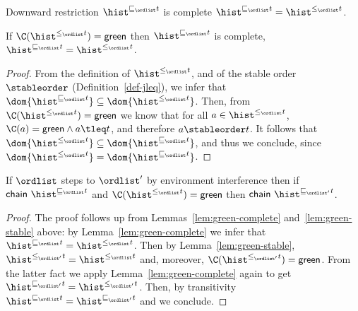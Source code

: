 
\begin{definition}[Complete]\label{def:complete}
Downward restriction $\chainjleq{t}{\ordlist}$ is {\sf complete} \Iff
$\chainjleq{t}{\ordlist} = \chaintleq{t}{\ordlist}$.
\end{definition}

\begin{lemma}\label{lem:green-complete}
  If $\C(\chaintleq{t}{\ordlist}) = {\sf green}$ then
  $\chainjleq{t}{\ordlist}$ is {\sf complete},
  \ie $\chainjleq{t}{\ordlist} = \chaintleq{t}{\ordlist}$.
\end{lemma}

\begin{proof}
From the definition of $\chaintleq{t}{\ordlist}$, and of the stable
order $\stableorder$ (Definition~\ref{def-jleq}), we infer that
$\dom{\chainjleq{t}{\ordlist}} \subseteq
\dom{\chaintleq{t}{\ordlist}}$. Then, from
$\C(\chaintleq{t}{\ordlist}) = {\sf green}$ we know that for all $a
\in \chaintleq{t}{\ordlist}$, $\C(a) = {\sf green} \wedge a \tleq t$,
and therefore $ a \stableorder t$. It follows that
$\dom{\chaintleq{t}{\ordlist}} \subseteq
\dom{\chainjleq{t}{\ordlist}}$, and thus we conclude, since
$\dom{\chaintleq{t}{\ordlist}} = \dom{\chainjleq{t}{\ordlist}}$.
\end{proof}


\begin{lemma}%
\label{lem:chain-stable}%
If $\ordlist$ steps to $\ordlist'$ by environment interference then
if $\mathsf{chain}\ \chainjleq{t}{\ordlist}$ and
$\C(\chaintleq{t}{\ordlist}) = {\sf green}$ then
$\mathsf{chain}\ \chainjleq{t}{\ordlist'}$.
\end{lemma}

\begin{proof}
The proof follows up from Lemmas~\ref{lem:green-complete}
and~\ref{lem:green-stable} above: by Lemma~\ref{lem:green-complete} we
infer that $\chainjleq{t}{\ordlist} = \chaintleq{t}{\ordlist}$. Then
by Lemma~\ref{lem:green-stable}, $\chaintleq{t}{\ordlist'} =
\chaintleq{t}{\ordlist}$ and, moreover, $\C(\chaintleq{t}{\ordlist'})
= {\sf green}$. From the latter fact we apply
Lemma~\ref{lem:green-complete} again to get $\chainjleq{t}{\ordlist'}
= \chaintleq{t}{\ordlist'}$. Then, by transitivity
$\chainjleq{t}{\ordlist} = \chainjleq{t}{\ordlist'}$ and we conclude.
\end{proof}

